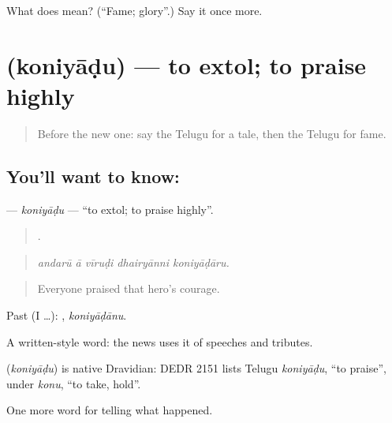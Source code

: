 \begin{tcolorbox}[breakable,colback=teal!4,colframe=teal!35!black,title={Before you move on}]
What does  mean? (\textquotedblleft{}Fame; glory\textquotedblright{}.) Say it once more.
\end{tcolorbox}
\section[\texorpdfstring{\te{కొనియాడు} (koniyāḍu)}{కొనియాడు (koniyāḍu)}]{ (koniyāḍu) — to extol; to praise highly}

\label{lesson:TE-C370-koniyadu}



\begin{quote}
Before the new one: say the Telugu for a tale, then the Telugu for fame.
\end{quote}

\subsection*{You'll want to know: }
\textbf{} — \emph{koniyāḍu} — \textquotedblleft{}to extol; to praise highly\textquotedblright{}.

\begin{quote}
    .
\end{quote}

\begin{quote}
\emph{andarū ā vīruḍi dhairyānni koniyāḍāru.}
\end{quote}

\begin{quote}
Everyone praised that hero's courage.
\end{quote}

Past (I …): , \emph{koniyāḍānu}.

A written-style word: the news uses it of speeches and tributes.

\begin{cousinweb}
\textbf{} (\emph{koniyāḍu}) is native Dravidian: DEDR 2151 lists Telugu \emph{koniyāḍu}, \textquotedblleft{}to praise\textquotedblright{}, under \emph{konu}, \textquotedblleft{}to take, hold\textquotedblright{}.
\end{cousinweb}

\begin{grammarlens}[title={What you've built}]
One more word for telling what happened.
\end{grammarlens}

